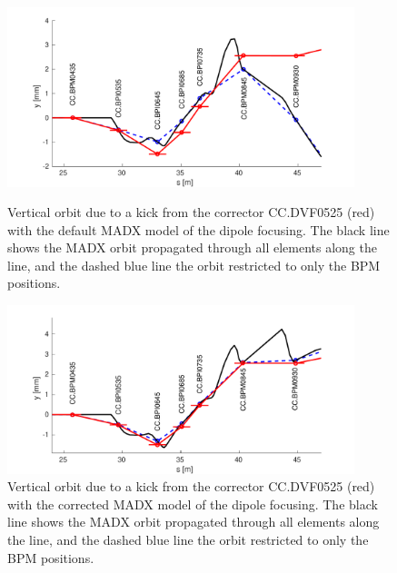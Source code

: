 \begin{figure}
  \centering
  \includegraphics[width=0.9\textwidth]{Figures/optics/modelOrigBendV}
  \caption{Vertical orbit due to a kick from the corrector CC.DVF0525 (red) with the default MADX model of the dipole focusing. The black line shows the MADX orbit propagated through all elements along the line, and the dashed blue line the orbit restricted to only the BPM positions.}
  \label{f:modelOrigBendV}
  \includegraphics[width=0.9\textwidth]{Figures/optics/modelCorrBendV}
  \caption{Vertical orbit due to a kick from the corrector CC.DVF0525 (red) with the corrected MADX model of the dipole focusing. The black line shows the MADX orbit propagated through all elements along the line, and the dashed blue line the orbit restricted to only the BPM positions.}
  \label{f:modelCorrBendV}
\end{figure}


